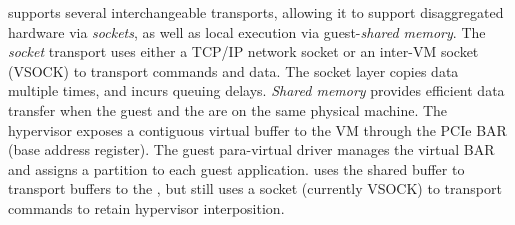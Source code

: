 \AvA supports several interchangeable transports, allowing it to support disaggregated hardware via \emph{sockets}, as well as local execution via guest-\worker \emph{shared memory}.
The \emph{socket} transport uses either a TCP/IP network socket or an inter-VM socket (VSOCK) to transport commands and data.
The socket layer copies data multiple times, and incurs queuing delays.
\emph{Shared memory} provides efficient data transfer when the guest and the \worker are on the same physical machine.
The hypervisor exposes a contiguous virtual buffer to the VM through the \vdev PCIe BAR (base address register).
The guest para-virtual driver manages the virtual BAR and assigns a partition to each guest application.
\AvA uses the shared buffer to transport buffers to the \worker,
but still uses a socket (currently VSOCK) to transport commands to retain hypervisor interposition.

